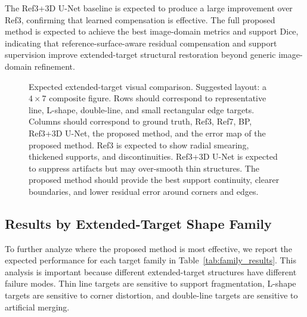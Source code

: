 \documentclass[journal]{IEEEtran}
\begin{document}
The Ref3+3D U-Net baseline is expected to produce a large improvement over Ref3, confirming that learned compensation is effective. The full proposed method is expected to achieve the best image-domain metrics and support Dice, indicating that reference-surface-aware residual compensation and support supervision improve extended-target structural restoration beyond generic image-domain refinement.

\begin{figure}[t]
\centering
{}
\caption{Expected extended-target visual comparison. Suggested layout: a $4\times7$ composite figure. Rows should correspond to representative line, L-shape, double-line, and small rectangular edge targets. Columns should correspond to ground truth, Ref3, Ref7, BP, Ref3+3D U-Net, the proposed method, and the error map of the proposed method. Ref3 is expected to show radial smearing, thickened supports, and discontinuities. Ref3+3D U-Net is expected to suppress artifacts but may over-smooth thin structures. The proposed method should provide the best support continuity, clearer boundaries, and lower residual error around corners and edges.}
\label{fig:extended_target_visual}
\end{figure}

\subsection{Results by Extended-Target Shape Family}
\label{subsec:family_results}

To further analyze where the proposed method is most effective, we report the expected performance for each target family in Table~\ref{tab:family_results}. This analysis is important because different extended-target structures have different failure modes. Thin line targets are sensitive to support fragmentation, L-shape targets are sensitive to corner distortion, and double-line targets are sensitive to artificial merging.
\end{document}
